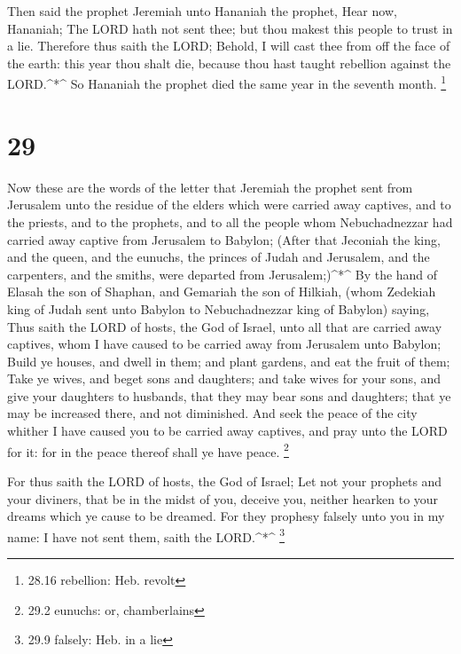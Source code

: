  Then said the prophet Jeremiah unto Hananiah the prophet,
Hear now, Hananiah; The LORD hath not sent thee; but thou makest this
people to trust in a lie.  Therefore thus saith the LORD;
Behold, I will cast thee from off the face of the earth: this year thou
shalt die, because thou hast taught rebellion against the LORD.\^{}*\^{}
 So Hananiah the prophet died the same year in the seventh
month. \footnote{28.16 rebellion: Heb. revolt}

\hypertarget{section-28}{%
\section{29}\label{section-28}}

 Now these are the words of the letter that Jeremiah the
prophet sent from Jerusalem unto the residue of the elders which were
carried away captives, and to the priests, and to the prophets, and to
all the people whom Nebuchadnezzar had carried away captive from
Jerusalem to Babylon;  (After that Jeconiah the king, and
the queen, and the eunuchs, the princes of Judah and Jerusalem, and the
carpenters, and the smiths, were departed from Jerusalem;)\^{}*\^{}
 By the hand of Elasah the son of Shaphan, and Gemariah the
son of Hilkiah, (whom Zedekiah king of Judah sent unto Babylon to
Nebuchadnezzar king of Babylon) saying,  Thus saith the LORD
of hosts, the God of Israel, unto all that are carried away captives,
whom I have caused to be carried away from Jerusalem unto Babylon;
 Build ye houses, and dwell in them; and plant gardens, and
eat the fruit of them;  Take ye wives, and beget sons and
daughters; and take wives for your sons, and give your daughters to
husbands, that they may bear sons and daughters; that ye may be
increased there, and not diminished.  And seek the peace of
the city whither I have caused you to be carried away captives, and pray
unto the LORD for it: for in the peace thereof shall ye have peace.
\footnote{29.2 eunuchs: or, chamberlains}

 For thus saith the LORD of hosts, the God of Israel; Let
not your prophets and your diviners, that be in the midst of you,
deceive you, neither hearken to your dreams which ye cause to be
dreamed.  For they prophesy falsely unto you in my name: I
have not sent them, saith the LORD.\^{}*\^{} \footnote{29.9 falsely:
  Heb. in a lie}

